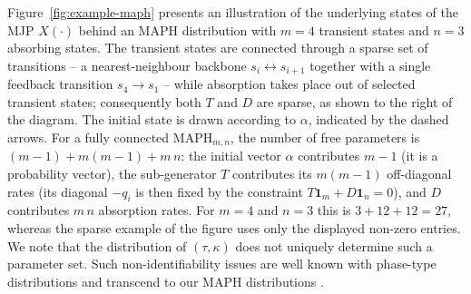 \documentclass{article}
\begin{document}
Figure~\ref{fig:example-maph} presents an illustration of the underlying states of the MJP $X(\cdot)$ behind an MAPH distribution with $m=4$ transient states and $n=3$ absorbing states. The transient states are connected through a sparse set of transitions -- a nearest-neighbour backbone $s_i \leftrightarrow s_{i+1}$ together with a single feedback transition $s_4 \to s_1$ -- while absorption takes place out of selected transient states; consequently both $T$ and $D$ are sparse, as shown to the right of the diagram. The initial state is drawn according to $\alpha$, indicated by the dashed arrows. For a fully connected $\text{MAPH}_{m,n}$, the number of free parameters is $(m-1) + m(m-1) + m\,n$: the initial vector $\alpha$ contributes $m-1$ (it is a probability vector), the sub-generator $T$ contributes its $m(m-1)$ off-diagonal rates (its diagonal $-q_i$ is then fixed by the constraint $T\mathbf{1}_m + D\mathbf{1}_n=0$), and $D$ contributes $m\,n$ absorption rates. For $m=4$ and $n=3$ this is $3 + 12 + 12 = 27$, whereas the sparse example of the figure uses only the displayed non-zero entries. We note that the distribution of $(\tau, \kappa)$ does not uniquely determine such a parameter set. Such non-identifiability issues are well known with phase-type distributions and transcend to our MAPH distributions \citep{bladt_sorensen}.
\end{document}
